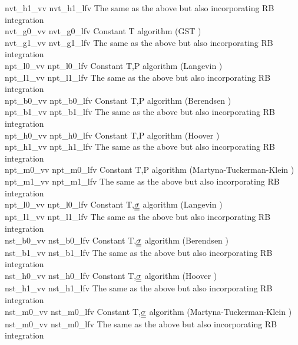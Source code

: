 \begin{tabbing}
{\sc nvt\_h1\_vv} \> {\sc nvt\_h1\_lfv} \> The same as the above but also incorporating RB integration \\
{\sc nvt\_g0\_vv} \> {\sc nvt\_g0\_lfv} \> Constant T algorithm (GST \cite{leimkuhler-09a}) \\
{\sc nvt\_g1\_vv} \> {\sc nvt\_g1\_lfv} \> The same as the above but also incorporating RB integration \\
{\sc npt\_l0\_vv} \> {\sc npt\_l0\_lfv} \> Constant T,P algorithm (Langevin \cite{quigley-04a}) \\
{\sc npt\_l1\_vv} \> {\sc npt\_l1\_lfv} \> The same as the above but also incorporating RB integration \\
{\sc npt\_b0\_vv} \> {\sc npt\_b0\_lfv} \> Constant T,P algorithm (Berendsen \cite{berendsen-84a}) \\
{\sc npt\_b1\_vv} \> {\sc npt\_b1\_lfv} \> The same as the above but also incorporating RB integration \\
{\sc npt\_h0\_vv} \> {\sc npt\_h0\_lfv} \> Constant T,P algorithm (Hoover \cite{hoover-85a}) \\
{\sc npt\_h1\_vv} \> {\sc npt\_h1\_lfv} \> The same as the above but also incorporating RB integration \\
{\sc npt\_m0\_vv} \> {\sc npt\_m0\_lfv} \> Constant T,P algorithm (Martyna-Tuckerman-Klein \cite{martyna-96a}) \\
{\sc npt\_m1\_vv} \> {\sc npt\_m1\_lfv} \> The same as the above but also incorporating RB integration \\
{\sc npt\_l0\_vv} \> {\sc npt\_l0\_lfv} \> Constant T,$\mbox{$\underline{\underline{\bf \sigma}}$}$ algorithm (Langevin \cite{quigley-04a}) \\
{\sc npt\_l1\_vv} \> {\sc npt\_l1\_lfv} \> The same as the above but also incorporating RB integration \\
{\sc nst\_b0\_vv} \> {\sc nst\_b0\_lfv} \> Constant T,$\mbox{$\underline{\underline{\bf \sigma}}$}$ algorithm (Berendsen \cite{berendsen-84a}) \\
{\sc nst\_b1\_vv} \> {\sc nst\_b1\_lfv} \> The same as the above but also incorporating RB integration \\
{\sc nst\_h0\_vv} \> {\sc nst\_h0\_lfv} \> Constant T,$\mbox{$\underline{\underline{\bf \sigma}}$}$ algorithm (Hoover \cite{hoover-85a}) \\
{\sc nst\_h1\_vv} \> {\sc nst\_h1\_lfv} \> The same as the above but also incorporating RB integration \\
{\sc nst\_m0\_vv} \> {\sc nst\_m0\_lfv} \> Constant T,$\mbox{$\underline{\underline{\bf \sigma}}$}$ algorithm (Martyna-Tuckerman-Klein \cite{martyna-96a}) \\
{\sc nst\_m0\_vv} \> {\sc nst\_m0\_lfv} \> The same as the above but also incorporating RB integration
\end{tabbing}

